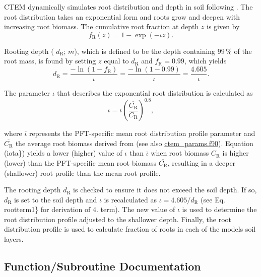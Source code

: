 C\+T\+E\+M dynamically simulates root distribution and depth in soil following \cite{Arora2003838}. The root distribution takes an exponential form and roots grow and deepen with increasing root biomass. The cumulative root fraction at depth $z$ is given by \[ \label{fracroo} f_\mathrm{R}(z) = 1 - \exp(-\iota z). \]

Rooting depth ( $d_\mathrm{R}$; $m$), which is defined to be the depth containing $99\,{\%}$ of the root mass, is found by setting $z$ equal to $d_\mathrm{R}$ and $f_\mathrm{R} = 0.99$, which yields \[ \label{rootterm1} d_\mathrm{R} = \frac{-\ln(1-f_\mathrm{R})}{\iota} = \frac{-\ln(1 - 0.99)}{\iota} = \frac{4.605}{\iota}. \]

The parameter $\iota$ that describes the exponential root distribution is calculated as \[ \label{iota} \iota = \overline{\iota} \left(\frac{\overline{C_\mathrm{R}}}{C_\mathrm{R}} \right)^{0.8}, \]

where $\overline{\iota}$ represents the P\+F\+T-\/specific mean root distribution profile parameter and $\overline{C_\mathrm{R}}$ the average root biomass derived from \cite{Jackson1996-va} (see also \hyperlink{ctem__params_8f90}{ctem\+\_\+params.\+f90}). Equation (iota\}) yields a lower (higher) value of $\iota$ than $\overline{\iota}$ when root biomass $C_\mathrm{R}$ is higher (lower) than the P\+F\+T-\/specific mean root biomass $\overline{C_\mathrm{R}}$, resulting in a deeper (shallower) root profile than the mean root profile.

The rooting depth $d_\mathrm{R}$ is checked to ensure it does not exceed the soil depth. If so, $d_\mathrm{R}$ is set to the soil depth and $\iota$ is recalculated as $\iota = 4.605/d_\mathrm{R}$ (see Eq. rootterm1\} for derivation of 4. term). The new value of $\iota$ is used to determine the root distribution profile adjusted to the shallower depth. Finally, the root distribution profile is used to calculate fraction of roots in each of the model\textquotesingle{}s soil layers. 

\subsection{Function/\+Subroutine Documentation}
\hypertarget{bio2str_8f_a3bc457fd89cd3f3af038e068b38b5919}{}
